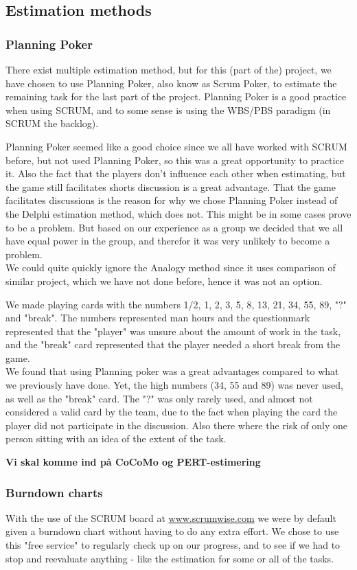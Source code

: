 \subsection{Estimation methods}
\subsubsection{Planning Poker}
There exist multiple estimation method, but for this (part of the) project, we have chosen to use Planning Poker, also know as Scrum Poker, to estimate the remaining task for the last part of the project. Planning Poker is a good practice when using SCRUM, and to some sense is using the WBS/PBS paradigm (in SCRUM the backlog).

Planning Poker seemed like a good choice since we all have worked with SCRUM before, but not used Planning Poker, so this was a great opportunity to practice it. Also the fact that the players don't influence each other when estimating, but the game still facilitates shorts discussion is a great advantage. That the game facilitates discussions is the reason for why we chose Planning Poker instead of the Delphi estimation method, which does not. This might be in some cases prove to be a problem. But based on our experience as a group we decided that we all have equal power in the group, and therefor it was very unlikely to become a problem. \\
We could quite quickly ignore the Analogy method since it uses comparison of similar project, which we have not done before, hence it was not an option.

We made playing cards with the numbers 1/2, 1, 2, 3, 5, 8, 13, 21, 34, 55, 89, "?" and "break". The numbers represented man hours and the questionmark represented that the "player" was unsure about the amount of work in the task, and the "break" card represented that the player needed a short break from the game.\\
We found that using Planning poker was a great advantages compared to what we previously have done. Yet, the high numbers (34, 55 and 89) was never used, as well as the "break" card. The "?" was only rarely used, and almost not considered a valid card by the team, due to the fact when playing the card the player did not participate in the discussion. Also there where the risk of only one person sitting with an idea of the extent of the task.

\textbf{Vi skal komme ind på CoCoMo og PERT-estimering}

\subsubsection{Burndown charts}
With the use of the SCRUM board at \url{www.scrumwise.com} we were by default given a burndown chart without having to do any extra effort. We chose to use this "free service" to regularly check up on our progress, and to see if we had to stop and reevaluate anything - like the estimation for some or all of the tasks.
